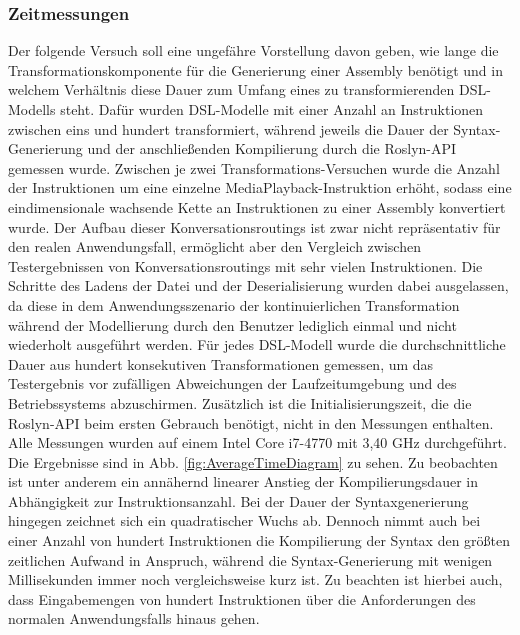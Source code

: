\subsubsection{Zeitmessungen}
Der folgende Versuch soll eine ungefähre Vorstellung davon geben, wie lange die Transformationskomponente für die Generierung einer Assembly benötigt und in welchem Verhältnis diese Dauer zum Umfang eines zu transformierenden DSL-Modells steht. Dafür wurden DSL-Modelle mit einer Anzahl an Instruktionen zwischen eins und hundert transformiert, während jeweils die Dauer der Syntax-Generierung und der anschließenden Kompilierung durch die Roslyn-API gemessen wurde. Zwischen je zwei Transformations-Versuchen wurde die Anzahl der Instruktionen um eine einzelne MediaPlayback-Instruktion erhöht, sodass eine eindimensionale wachsende Kette an Instruktionen zu einer Assembly konvertiert wurde. Der Aufbau dieser Konversationsroutings ist zwar nicht repräsentativ für den realen Anwendungsfall, ermöglicht aber den Vergleich zwischen Testergebnissen von Konversationsroutings mit sehr vielen Instruktionen. Die Schritte des Ladens der Datei und der Deserialisierung wurden dabei ausgelassen, da diese in dem Anwendungsszenario der kontinuierlichen Transformation während der Modellierung durch den Benutzer lediglich einmal und nicht wiederholt ausgeführt werden. Für jedes DSL-Modell wurde die durchschnittliche Dauer aus hundert konsekutiven Transformationen gemessen, um das Testergebnis vor zufälligen Abweichungen der Laufzeitumgebung und des Betriebssystems abzuschirmen. Zusätzlich ist die Initialisierungszeit, die die Roslyn-API beim ersten Gebrauch benötigt, nicht in den Messungen enthalten. Alle Messungen wurden auf einem Intel Core i7-4770 mit 3,40 GHz durchgeführt. Die Ergebnisse sind in Abb. \ref{fig:AverageTimeDiagram} zu sehen. 
\newline
Zu beobachten ist unter anderem ein annähernd linearer Anstieg der Kompilierungsdauer in Abhängigkeit zur Instruktionsanzahl. Bei der Dauer der Syntaxgenerierung hingegen zeichnet sich ein quadratischer Wuchs ab. Dennoch nimmt auch bei einer Anzahl von hundert Instruktionen die Kompilierung der Syntax den größten zeitlichen Aufwand in Anspruch, während die Syntax-Generierung mit wenigen Millisekunden immer noch vergleichsweise kurz ist. Zu beachten ist hierbei auch, dass Eingabemengen von hundert Instruktionen über die Anforderungen des normalen Anwendungsfalls hinaus gehen.

